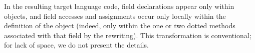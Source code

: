 
In the resulting target language code, field declarations appear only within objects,
and field accesses and assignments occur only locally within the definition
of the object (indeed, only within the one or two dotted methods associated with
that field by the rewriting).
This transformation is conventional; for lack of space, we do not present the details.

